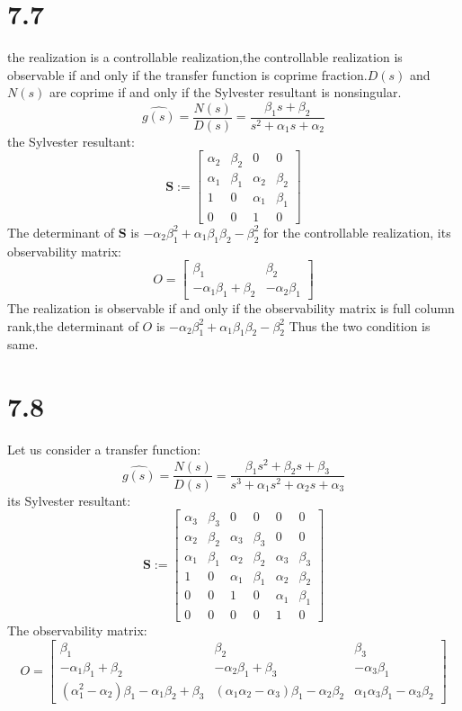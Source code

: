 \documentclass{article}
\begin{document}
\section*{7.7}
the realization is a controllable realization,the controllable realization is observable if and only if the transfer function is coprime fraction.$D(s)$ and $N(s)$ are coprime if and only if the Sylvester resultant is nonsingular.
\[
\hat{g(s)}=\frac{N(s)}{D(s)}=\frac{\beta_1s+\beta_2}{s^2+\alpha_1s+\alpha_2}    
\]
the Sylvester resultant:
\[
    \textbf{S}:=
    \left[
        \begin{array}{cccc}
            \alpha_2 & \beta_2 & 0 &0\\
            \alpha_1 & \beta_1 & \alpha_2 & \beta_2\\
            1 & 0 &\alpha_1 & \beta_1\\
            0 & 0 & 1& 0
        \end{array}
    \right]
\]
The determinant of \textbf{S} is $-\alpha_2\beta_1^2+\alpha_1\beta_1\beta_2-\beta_2^2$
for the controllable realization, its observability matrix:
\[
O=\left[
    \begin{array}{cc}
        \beta_1 & \beta_2\\
        -\alpha_1\beta_1+\beta_2 & -\alpha_2\beta_1
    \end{array}
\right]    
\]
The realization is observable if and only if the observability matrix is full column rank,the determinant of $O$ is  $-\alpha_2\beta_1^2+\alpha_1\beta_1\beta_2-\beta_2^2$
Thus the two condition is same.
\section*{7.8}
Let us consider a transfer function:
\[
\hat{g(s)}=\frac{N(s)}{D(s)}=\frac{\beta_1s^2+\beta_2s+\beta_3}{s^3+\alpha_1s^2+\alpha_2s+\alpha_3}   
\]
its Sylvester resultant:
\[
    \textbf{S}:=
    \left[
        \begin{array}{cccccc}
            \alpha_3 & \beta_3 & 0        &0        & 0        & 0   \\
            \alpha_2 & \beta_2 & \alpha_3 & \beta_3 & 0        & 0   \\
            \alpha_1 & \beta_1 & \alpha_2 & \beta_2 & \alpha_3 & \beta_3 \\
            1        & 0       & \alpha_1 & \beta_1 & \alpha_2 & \beta_2   \\
            0        & 0       & 1        & 0       & \alpha_1 & \beta_1 \\
            0        & 0       & 0        & 0       & 1        & 0
        \end{array}
    \right]
\]
The observability matrix:
\[
O=
\left[
    \begin{array}{ccc}
    \beta_1 & \beta_2 & \beta_3\\
    -\alpha_1\beta_1+\beta_2 & -\alpha_2\beta_1+\beta_3 & -\alpha_3\beta_1\\
    (\alpha_1^2-\alpha_2)\beta_1-\alpha_1\beta_2+\beta_3 &(\alpha_1\alpha_2-\alpha_3)\beta_1-\alpha_2\beta_2 & \alpha_1\alpha_3\beta_1-\alpha_3\beta_2
    \end{array}
\right]    
\]
\end{document}
